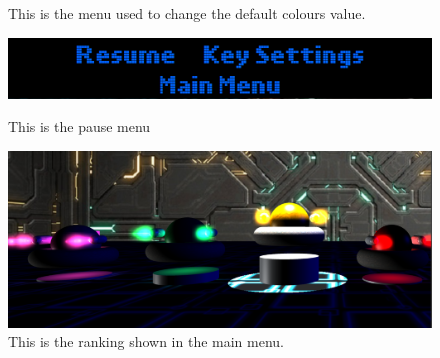 \documentclass[11pt]{article}
\begin{document}
\begin{figure}
\begin{minipage}[b]{0.6\linewidth}
		\caption{This is the menu used to change the default colours value.}
		\label{fig:colorMenu}
	\end{minipage}
	\begin{minipage}[b]{0.6\linewidth}
		\includegraphics[width=\linewidth]{pauseMenu}
		\caption{This is the pause menu}
		\label{fig:endGameMenu4}
	\end{minipage}
	\begin{minipage}[b]{0.6\linewidth}
		\includegraphics[width=\linewidth]{Ranking}
		\caption{This is the ranking shown in the main menu.}
		\label{fig:Ranking}
	\end{minipage}
\end{figure}
\end{document}
